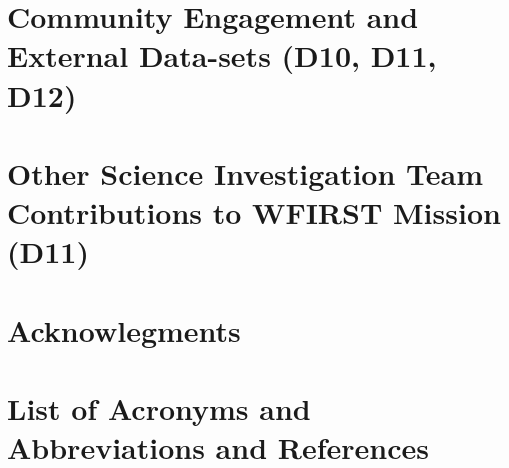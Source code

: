 \documentclass[letter]{ar-1col_WFIRST-HLS}
\newcommand{\Oli}[1]{\textcolor{red}{[{\bf Oli}: #1]}}
\begin{document}
\section{Community Engagement and External Data-sets (D10, D11, D12)}
\label{sec:engagement}


%

\section{Other Science Investigation Team Contributions to WFIRST Mission (D11)}
\label{sec:other_contributions}


\vspace{-0.25cm}
\section*{Acknowlegments}
\label{sec:acknowledgments}


\newpage

\section*{List of Acronyms and Abbreviations and References}
\label{sec:acronyms}
\vspace{2 cm}


\clearpage
\newpage


%



\clearpage
\newpage
\end{document}
